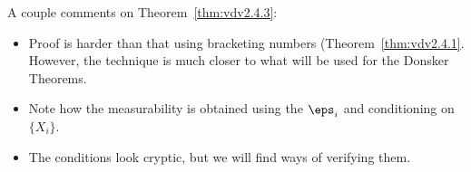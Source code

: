 \begin{remark*}
	A couple comments on Theorem~\ref{thm:vdv2.4.3}:
	\begin{itemize}
		\item Proof is harder than that using bracketing numbers (Theorem~\ref{thm:vdv2.4.1}. However, the technique is much closer to what will be used for the Donsker Theorems. 
		\item Note how the measurability is obtained using the \(\eps_i\) and conditioning on  \(\{X_i\}\).
		\item The conditions look cryptic, but we will find ways of verifying them.
	\end{itemize}
\end{remark*}



